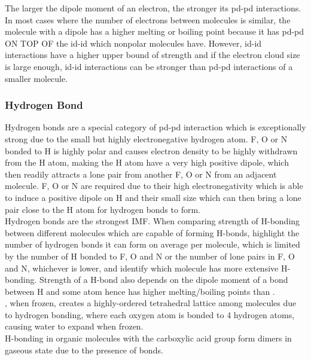 \documentclass[../main]{subfiles}
\begin{document}
	The larger the dipole moment of an electron, the stronger its pd-pd interactions. \\

	In most cases where the number of electrons between molecules is similar, the molecule with a dipole has a higher melting or boiling point because it has pd-pd ON TOP OF the id-id which nonpolar molecules have. However, id-id interactions have a higher upper bound of strength and if the electron cloud size is large enough, id-id interactions can be stronger than pd-pd interactions of a smaller molecule.

	\subsubsection{Hydrogen Bond}

	Hydrogen bonds are a special category of pd-pd interaction which is exceptionally strong due to the small but highly electronegative hydrogen atom. F, O or N bonded to H is highly polar and causes electron density to be highly withdrawn from the H atom, making the H atom have a very high positive dipole, which then readily attracts a lone pair from another F, O or N from an adjacent molecule. F, O or N are required due to their high electronegativity which is able to induce a positive dipole on H and their small size which can then bring a lone pair close to the H atom for hydrogen bonds to form. \\

	Hydrogen bonds are the strongest IMF. When comparing strength of H-bonding between different molecules which are capable of forming H-bonds, highlight the number of hydrogen bonds it can form on average per molecule, which is limited by the number of H bonded to F, O and N or the number of lone pairs in F, O and N, whichever is lower, and identify which molecule has more extensive H-bonding. Strength of a H-bond also depends on the dipole moment of a bond between H and some atom hence  has higher melting/boiling points than . \\

	, when frozen, creates a highly-ordered tetrahedral lattice among molecules due to hydrogen bonding, where each oxygen atom is bonded to 4 hydrogen atoms, causing water to expand when frozen. \\

	H-bonding in organic molecules with the carboxylic acid group  form dimers in gaseous state due to the presence of  bonds. \\
\end{document}
